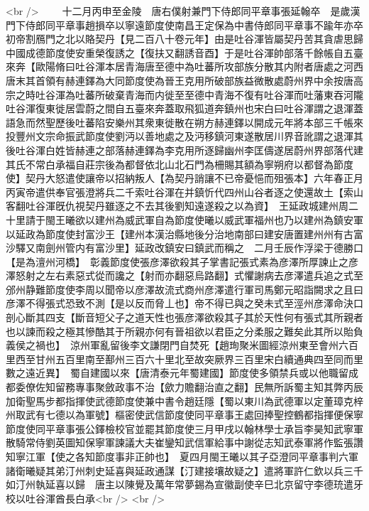 <br />
　　十二月丙申至金陵　唐右僕射兼門下侍郎同平章事張延翰卒　是歲漢門下侍郎同平章事趙損卒以寧遠節度使南昌王定保為中書侍郎同平章事不踰年亦卒　初帝割鴈門之北以賂契丹【見二百八十卷元年】由是吐谷渾皆屬契丹苦其貪虐思歸中國成德節度使安重榮復誘之【復扶又翻誘音酉】于是吐谷渾帥部落千餘帳自五臺來奔【歐陽脩曰吐谷渾本居青海唐至德中為吐蕃所攻部族分散其内附者唐處之河西唐末其首領有赫連鐸為大同節度使為晉王克用所破部族益微散處蔚州界中余按唐高宗之時吐谷渾為吐蕃所破棄青海而内徙至至德中青海不復有吐谷渾而吐藩東吞河隴吐谷渾復東徙居雲蔚之間自五臺來奔蓋取飛狐道奔鎮州也宋白曰吐谷渾謂之退渾蓋語急而然聖歷後吐蕃陷安樂州其衆東徙散在朔方赫連鐸以開成元年將本部三千帳來投豐州文宗命振武節度使劉沔以善地處之及沔移鎮河東遂散居川界音訛謂之退渾其後吐谷渾白姓皆赫連之部落赫連鐸為李克用所逐歸幽州李匡儔遂居蔚州界部落代建其氏不常白承福自莊宗後為都督依北山北石門為柵賜其額為寧朔府以都督為節度使】契丹大怒遣使讓帝以招納叛人【為契丹誚讓不已帝憂悒而殂張本】六年春正月丙寅帝遣供奉官張澄將兵二千索吐谷渾在并鎮忻代四州山谷者逐之使還故土【索山客翻吐谷渾旣仇視契丹雖逐之不去其後劉知遠遂殺之以為資】　王延政城建州周二十里請于閩王曦欲以建州為威武軍自為節度使曦以威武軍福州也乃以建州為鎮安軍以延政為節度使封富沙王【建州本漢治縣地後分治地南部曰建安唐置建州州有古富沙驛又南劍州管内有富沙里】延政改鎮安曰鎮武而稱之　二月壬辰作浮梁于德勝口【是為澶州河橋】　彰義節度使張彦澤欲殺其子掌書記張式素為彦澤所厚諫止之彦澤怒射之左右素惡式從而讒之【射而亦翻惡烏路翻】式懼謝病去彦澤遣兵追之式至邠州静難節度使李周以聞帝以彦澤故流式商州彦澤遣行軍司馬鄭元昭詣闕求之且曰彦澤不得張式恐致不測【是以反而脅丄也】帝不得已與之癸未式至涇州彦澤命決口剖心斷其四支【斷音短父子之道天性也張彦澤欲殺其子其於天性何有張式其所親者也以諫而殺之極其慘酷其于所親亦何有晉祖欲以君臣之分柔服之難矣此其所以貽負義侯之禍也】　涼州軍亂留後李文謙閉門自焚死【趙珣聚米圖經涼州東至會州六百里西至甘州五百里南至鄯州三百六十里北至故突厥界三百里宋白續通典四至同而里數之遠近異】　蜀自建國以來【唐清泰元年蜀建國】節度使多領禁兵或以他職留成都委僚佐知留務專事聚斂政事不治【歛力贍翻治直之翻】民無所訴蜀主知其弊丙辰加衛聖馬步都指揮使武德節度使兼中書令趙廷隱【蜀以東川為武德軍以定董璋克梓州取武有七德以為軍號】樞密使武信節度使同平章事王處回捧聖控鶴都指揮便保寧節度使同平章事張公鐸檢校官並罷其節度使三月甲戌以翰林學士承旨李昊知武寧軍散騎常侍劉英圖知保寧軍諫議大夫崔鑾知武信軍給事中謝從志知武泰軍將作監張讚知寧江軍【使之各知節度事非正帥也】　夏四月閩王曦以其子亞澄同平章事判六軍諸衛曦疑其弟汀州刺史延喜與延政通謀【汀建接壤故疑之】遣將軍許仁欽以兵三千如汀州執延喜以歸　唐主以陳覺及萬年常夢錫為宣徽副使辛巳北京留守李德珫遣牙校以吐谷渾酋長白承<br />
<br />
